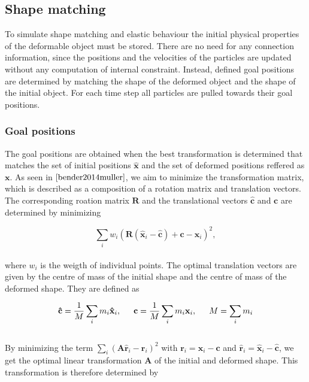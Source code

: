 \subsection{Shape matching}

To simulate shape matching and elastic behaviour the initial physical properties of the deformable
object must be stored. There are no need for any connection information, since the positions and the velocities of the particles 
are updated without any computation of internal constraint. Instead, defined goal positions are determined by matching the shape of the deformed 
object and the shape of the initial object. For each time step all particles are pulled towards their goal positions.

\subsubsection{Goal positions}
The goal positions are obtained when the best transformation is determined that matches the set of initial positions 
$\mathbf{\hat{x}}$ and the set of deformed positions reffered as $\mathbf{x}$. As seen in $\cite{bender2014muller}$, we aim to minimize the transformation matrix, 
which is described as a composition of a rotation matrix 
and translation vectors. The corresponding roation matrix $\mathbf{R}$ and the translational vectors
$\mathbf{\hat{c}}$ and $\mathbf{c}$ are determined by minimizing 

\begin{equation}
\label{eq:MinR}
\sum\limits_{i} w_{i}\left(\mathbf{R}(\mathbf{\hat{x}}_{i} - \mathbf{\hat{c}}) + \mathbf{c} - \mathbf{x}_{i} \right)^{2},
\end{equation}
\\
where $w_{i}$ is the weigth of individual points. The optimal translation vectors are given by the centre of mass of the initial shape and the centre of mass
of the deformed shape. They are defined as

\begin{equation}
\label{eq:TransVec}
\mathbf{\hat{c}} = \frac{1}{M} \sum\limits_{i} m_{i}\mathbf{\hat{x}}_{i} , \indent
\mathbf{c} = \frac{1}{M} \sum\limits_{i} m_{i}\mathbf{x}_{i} , \indent
M = \sum\limits_{i} m_{i} 
\end{equation}
\\
By minimizing the term $\sum\limits_{i} (\mathbf{A}\mathbf{\hat{r}}_{i} - \mathbf{r}_{i})^2$ with $ \mathbf{r}_{i} = \mathbf{x}_{i} - 
\mathbf{c}$ and $\mathbf{\hat{r}}_{i} = \mathbf{\hat{x}}_{i} - \mathbf{\hat{c}} $, we get the optimal linear transformation $\mathbf{A}$
of the initial and deformed shape. This transformation is therefore determined by


